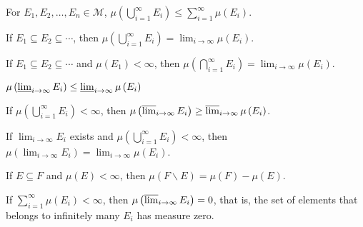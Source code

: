 \documentclass[class=book, crop=false]{standalone}
\begin{document}
        \begin{theorem}
            For $E_1, E_2, \dots, E_n \in \mathscr{M}$, $\mu\left(\bigcup^{\infty}_{i = 1} E_i\right) \leq \sum^{\infty}_{i = 1} \mu(E_i)$.
        \end{theorem}

        \begin{theorem}
            If $E_1 \subseteq E_2 \subseteq \cdots$, then $\mu\left(\bigcup^{\infty}_{i = 1} E_i\right) = \lim_{i \rightarrow \infty} \mu(E_i)$.
        \end{theorem}

        \begin{theorem}
            If $E_1 \subseteq E_2 \subseteq \cdots$ and $\mu(E_1) < \infty$, then $\mu\left(\bigcap^{\infty}_{i = 1} E_i\right) = \lim_{i \rightarrow \infty} \mu(E_i)$.
        \end{theorem}

        \begin{theorem}
            $\mu\left(\varliminf_{i \rightarrow \infty} E_i\right) \leq \varliminf_{i \rightarrow \infty} \mu\left(E_i\right)$
        \end{theorem}

        \begin{theorem}
            If $\mu\left(\bigcup^{\infty}_{i = 1} E_i\right) < \infty$, then $\mu\left(\varlimsup_{i \rightarrow \infty} E_i\right) \geq \varlimsup_{i \rightarrow \infty} \mu\left(E_i\right)$.
        \end{theorem}

        \begin{theorem}
            If $\lim_{i \rightarrow \infty} E_i$ exists and $\mu\left(\bigcup^{\infty}_{i = 1} E_i\right) < \infty$, then $\mu\left(\lim_{i \rightarrow \infty} E_i\right) = \lim_{i \rightarrow \infty} \mu\left(E_i\right)$.
        \end{theorem}

        \begin{theorem}[Subtraction]
            If $E \subseteq F$ and $\mu(E) < \infty$, then $\mu(F \backslash E) = \mu(F) - \mu(E)$.
        \end{theorem}

        \begin{theorem}
            If $\sum^{\infty}_{i = 1} \mu(E_i) < \infty$, then $\mu\left(\varlimsup_{i \rightarrow \infty} E_i\right) = 0$, that is, the set of elements that belongs to infinitely many $E_i$ has measure zero.
        \end{theorem}
\end{document}
